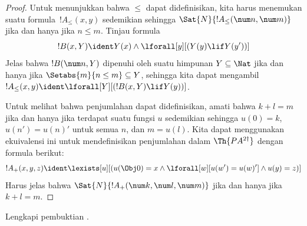 \documentclass[../../../include/open-logic-section]{subfiles}
\begin{document}
\begin{proof}
Untuk menunjukkan bahwa $\le$ dapat didefinisikan, kita harus menemukan
suatu formula~$!A_\le(x, y)$ sedemikian sehingga
$\Sat{N}{!A_\le(\num n, \num m)}$ jika dan hanya jika $n \le m$. Tinjau
formula
\[
!B(x, Y) \ident Y(x) \land \lforall[y][(Y(y) \lif Y(y'))]
\]
Jelas bahwa $!B(\num n, Y)$ dipenuhi oleh suatu himpunan $Y \subseteq \Nat$
jika dan hanya jika $\Setabs{m}{n \le m} \subseteq Y$, sehingga kita dapat
mengambil $!A_\le(x, y) \ident \lforall[Y][(!B(x, Y) \lif Y(y))]$.

Untuk melihat bahwa penjumlahan dapat didefinisikan, amati bahwa $k+l=m$
jika dan hanya jika terdapat suatu fungsi $u$ sedemikian sehingga $u(0)=k$,
$u(n')=u(n)'$ untuk semua $n$, dan $m = u(l)$. Kita dapat menggunakan
ekuivalensi ini untuk mendefinisikan penjumlahan dalam
$\Th{PA^{2\dagger}}$ dengan formula berikut:
\[
!A_+(x,y,z) \ident \lexists[u][(u(\Obj 0)=x \land \lforall[w][u(w')=u(w)']
 \land u(y)=z)]
\] 
Harus jelas bahwa $\Sat{N}{!A_+(\num k, \num l, \num m)}$ jika dan hanya
jika $k+l=m$.
\end{proof}

\begin{prob}
Lengkapi pembuktian .
\end{prob}
\end{document}
